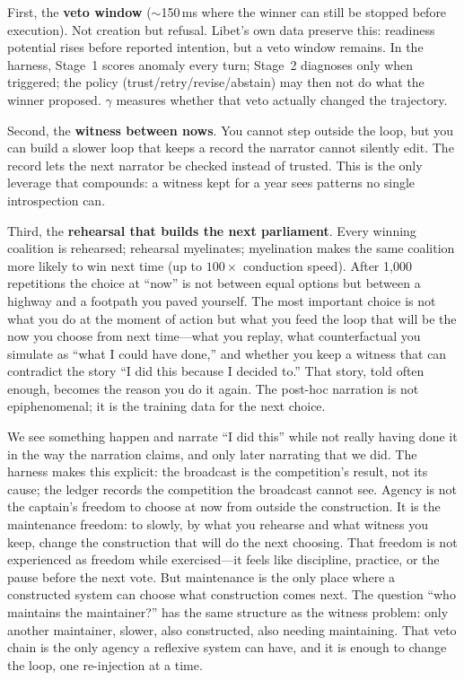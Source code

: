 \documentclass[11pt]{article}
\begin{document}
First, the \textbf{veto window} ($\sim$150\,ms where the winner can
still be stopped before execution). Not creation but refusal. Libet's
own data preserve this: readiness potential rises before reported
intention, but a veto window remains. In the harness, Stage~1 scores
anomaly every turn; Stage~2 diagnoses only when triggered; the policy
(trust/retry/revise/abstain) may then not do what the winner proposed.
$\gamma$ measures whether that veto actually changed the trajectory.

Second, the \textbf{witness between nows}. You cannot step outside the
loop, but you can build a slower loop that keeps a record the narrator
cannot silently edit. The record lets the next narrator be checked
instead of trusted. This is the only leverage that compounds: a witness
kept for a year sees patterns no single introspection can.

Third, the \textbf{rehearsal that builds the next parliament}.
Every winning coalition is rehearsed; rehearsal myelinates; myelination
makes the same coalition more likely to win next time (up to $100\times$
conduction speed). After 1,000 repetitions the choice at ``now'' is not
between equal options but between a highway and a footpath you paved
yourself. The most important choice is not what you do at the moment of
action but what you feed the loop that will be the now you choose from
next time---what you replay, what counterfactual you simulate as ``what
I could have done,'' and whether you keep a witness that can contradict
the story ``I did this because I decided to.'' That story, told often
enough, becomes the reason you do it again. The post-hoc narration is
not epiphenomenal; it is the training data for the next choice.

We see something happen and narrate ``I did this'' while not really
having done it in the way the narration claims, and only later
narrating that we did. The harness makes this explicit: the broadcast is
the competition's result, not its cause; the ledger records the
competition the broadcast cannot see. Agency is not the captain's
freedom to choose at now from outside the construction. It is the
maintenance freedom: to slowly, by what you rehearse and what witness
you keep, change the construction that will do the next choosing.
That freedom is not experienced as freedom while exercised---it feels
like discipline, practice, or the pause before the next vote. But
maintenance is the only place where a constructed system can choose
what construction comes next. The question ``who maintains the
maintainer?'' has the same structure as the witness problem: only
another maintainer, slower, also constructed, also needing maintaining.
That veto chain is the only agency a reflexive system can have, and it
is enough to change the loop, one re-injection at a time.
\end{document}
